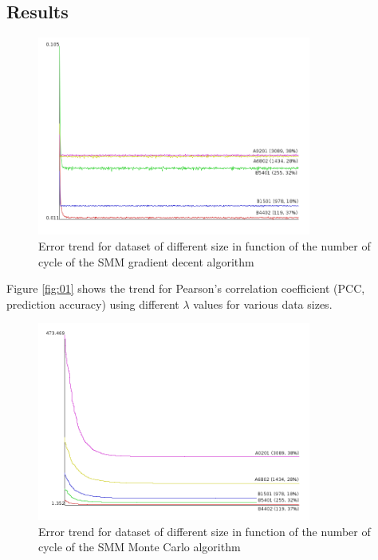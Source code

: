 \documentclass{bioinfo}
\begin{document}
\begin{application}
\section*{Results}

\begin{figure}[!tpb]
\centerline{\includegraphics[width=9cm]{fig/smm_error.png}}
\caption{Error trend for dataset of different size in function of the number of cycle of the SMM gradient decent algorithm}
\label{fig:03}
\end{figure}

Figure \ref{fig:01} shows the trend for Pearson's correlation coefficient (PCC, prediction accuracy) using different $\lambda$ values for various data sizes.




\begin{figure}[!tpb]
\centerline{\includegraphics[width=9cm]{fig/smm_mc_error.png}}
\caption{Error trend for dataset of different size in function of the number of cycle of the SMM Monte Carlo algorithm}
\label{fig:04}
\end{figure}


\end{application}
\end{document}

